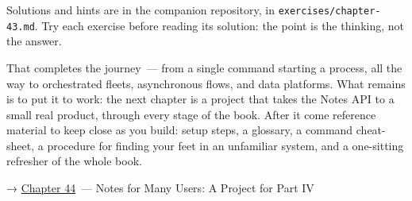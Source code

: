 \noindent{}Solutions and hints are in the companion repository, in \texttt{exercises/}\allowbreak{}\texttt{chapter-43.md}. Try each exercise before reading its solution: the point is the thinking, not the answer.

\label{43-cloud-native-orchestration:whats-next}

That completes the journey~--- from a single command starting a process, all the way to orchestrated fleets, asynchronous flows, and data platforms. What remains is to put it to work: the next chapter is a project that takes the Notes API to a small real product, through every stage of the book. After it come reference material to keep close as you build: setup steps, a glossary, a command cheat-sheet, a procedure for finding your feet in an unfamiliar system, and a one-sitting refresher of the whole book.

\noindent{}→ \hyperref[ch:44-project-notes-for-many-users]{Chapter 44}~--- Notes for Many Users: A Project for Part IV
